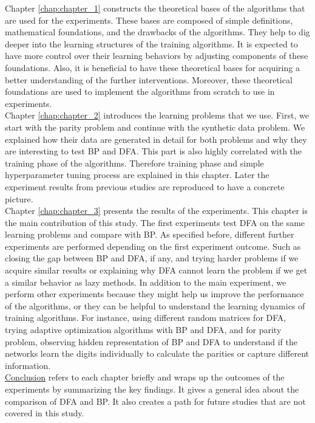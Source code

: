 \documentclass[a4paper, nobind]{templates/ociamthesis}
\begin{document}
Chapter \ref{chap:chapter_1} constructs the theoretical bases of the algorithms that are used for the experiments. These bases are composed of simple definitions, mathematical foundations, and the drawbacks of the algorithms. They help to dig deeper into the learning structures of the training algorithms. It is expected to have more control over their learning behaviors by adjusting components of these foundations. Also, it is beneficial to have these theoretical bases for acquiring a better understanding of the further interventions. Moreover, these theoretical foundations are used to implement the algorithms from scratch to use in experiments.\\
Chapter \ref{chap:chapter_2} introduces the learning problems that we use. First, we start with the parity problem and continue with the synthetic data problem. We explained how their data are generated in detail for both problems and why they are interesting to test BP and DFA. This part is also highly correlated with the training phase of the algorithms. Therefore training phase and simple hyperparameter tuning process are explained in this chapter. Later the experiment results from previous studies \cite{DBLP:journals/corr/abs-2002-07400, chizat2020implicit} are reproduced to have a concrete picture.\\
Chapter \ref{chap:chapter_3} presents the results of the experiments. This chapter is the main contribution of this study. The first experiments test DFA on the same learning problems and compare with BP. As specified before, different further experiments are performed depending on the first experiment outcome. Such as closing the gap between BP and DFA, if any, and trying harder problems if we acquire similar results or explaining why DFA cannot learn the problem if we get a similar behavior as lazy methods. In addition to the main experiment, we perform other experiments because they might help us improve the performance of the algorithms, or they can be helpful to understand the learning dynamics of training algorithms. For instance, using different random matrices for DFA, trying adaptive optimization algorithms with BP and DFA, and for parity problem, observing hidden representation of BP and DFA to understand if the networks learn the digits individually to calculate the parities or capture different information.\\
\protect\hyperlink{conc}{Conclusion} refers to each chapter briefly and wraps up the outcomes of the experiments by summarizing the key findings. It gives a general idea about the comparison of DFA and BP. It also creates a path for future studies that are not covered in this study.
\end{document}
